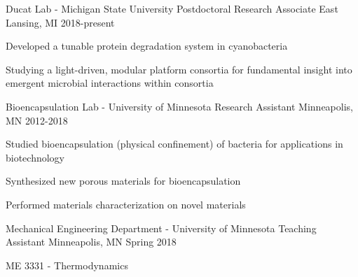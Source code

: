 


\begin{cventries}


\cventry
{Ducat Lab - Michigan State University} %
{Postdoctoral Research Associate} %
{East Lansing, MI} %
{2018-present} %
{ %
	\begin{cvitems}
		\item {Developed a tunable protein degradation system in cyanobacteria}
		\item {Studying a light-driven, modular platform consortia for fundamental insight into emergent microbial interactions within consortia}
	\end{cvitems}
}

\cventry
{Bioencapsulation Lab - University of Minnesota} %
{Research Assistant} %
{Minneapolis, MN} %
{2012-2018} %
{ %
	\begin{cvitems}
		\item {Studied bioencapsulation (physical confinement) of bacteria for applications in biotechnology}
		\item {Synthesized new porous materials for bioencapsulation}
		\item {Performed materials characterization on novel materials}
	\end{cvitems}
}

\cventry
{Mechanical Engineering Department - University of Minnesota} %
{Teaching Assistant} %
{Minneapolis, MN} %
{Spring 2018} %
{ %
	\begin{cvitems}
		\item {ME 3331 - Thermodynamics}
	\end{cvitems}
}


\end{cventries}
